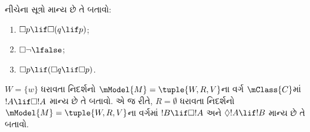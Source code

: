 \documentclass[../../../include/open-logic-section]{subfiles}
\begin{document}
\begin{prob}
  નીચેના સૂત્રો માન્ય છે તે બતાવો:
  \begin{enumerate}
  \item $\Box p \lif \Box (q \lif p)$;
  \item $\Box \lnot \lfalse$;
  \item $\Box p \lif (\Box q \lif \Box p)$.
  \end{enumerate}
\end{prob}

\begin{prob}
  $W = \{w\}$ ધરાવતા નિદર્શનો $\mModel{M} =
  \tuple{W, R, V}$ના વર્ગ $\mClass{C}$માં
  $!A \lif \Box!A$ માન્ય છે તે બતાવો. એ જ રીતે,
  $R = \emptyset$ ધરાવતા નિદર્શનો $\mModel{M} =
  \tuple{W, R, V}$ના વર્ગમાં $!B \lif \Box !A$
  અને $\Diamond !A \lif !B$ માન્ય છે તે બતાવો.
\end{prob}
\end{document}
